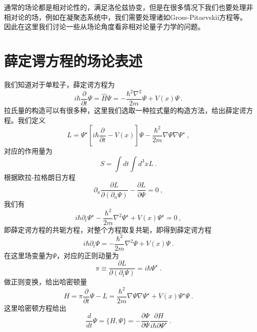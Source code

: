 
\begin{issues}
\issueDraft
\end{issues}

通常的场论都是相对论性的，满足洛伦兹协变，但是在很多情况下我们也要处理非相对论的场，例如在凝聚态系统中，我们需要处理诸如Gross-Pitaevskii方程等。因此在这里我们讨论一些从场论角度看非相对论量子力学的问题。
\section{薛定谔方程的场论表述}
我们知道对于单粒子，薛定谔方程为
\begin{equation}
i\hbar \frac{\partial}{\partial t} \Psi = \hat{H} \Psi = -\frac{\hbar^2 \nabla^2}{2m} \Psi + V(x)\Psi ~.
\end{equation}
拉氏量的构造可以有很多种，这里我们选取一种拉式量的构造方法，给出薛定谔方程。我们定义
$$
L =  \Psi^\star [i\hbar \frac{\partial}{\partial t}  - V(x)]\Psi - \frac{\hbar^2}{2m}\nabla \Psi \nabla \Psi^\star~,
$$
对应的作用量为
$$
S = \int dt \int d^3 x L~.
$$
根据欧拉-拉格朗日方程
$$
\partial_u \frac{\partial L}{\partial (\partial_u \Psi)} - \frac{\partial L}{\partial \Psi}=0 ~,
$$
我们有
$$
i\hbar \partial_t \Psi^\star - \frac{\hbar^2}{2m}\nabla^2 \Psi^\star + V(x)\Psi^\star=0 ~,
$$
即薛定谔方程的共轭方程，对整个方程取复共轭，即得到薛定谔方程
$$
i\hbar \partial_t \Psi = -\frac{\hbar^2}{2m}\nabla^2 \Psi + V(x)\Psi ~.
$$
在这里场变量为$\Psi$，对应的正则动量为
$$
\pi \equiv \frac{\partial L}{\partial (\partial_t \Psi)} = i\hbar \Psi^\star~.
$$
做正则变换，给出哈密顿量
$$
H = \pi \frac{\partial}{\partial t}\Psi - L =  \frac{\hbar^2}{2m} \nabla\Psi \nabla \Psi^\star+ V(x)\Psi^\star\Psi~.
$$
这里哈密顿方程给出
$$
\frac{d}{d t}\Psi = \{H,\Psi\} = -\frac{\partial \Psi}{\partial \Psi}\frac{\partial H}{i\hbar \partial \Psi^\star}~.
$$